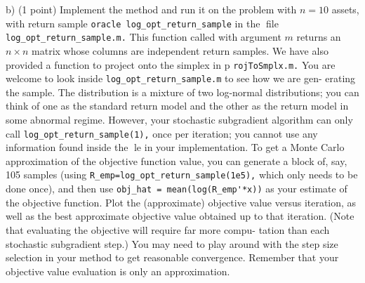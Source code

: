 \documentclass{article}
\begin{document}
b) (1 point) Implement the method and run it on the problem with $n = 10$ assets,
with return sample \verb|oracle log_opt_return_sample| in the file \verb|log_opt_return_sample.m.|
This function called with argument $m$ returns an $n \times n$ matrix whose columns
are independent return samples. We have also provided a function to project onto the simplex in p
\verb|rojToSmplx.m.|
You are welcome to look inside \verb|log_opt_return_sample.m| to see how we are gen-
erating the sample. The distribution is a mixture of two log-normal distributions;
you can think of one as the standard return model and the other as the return
model in some abnormal regime. However, your stochastic subgradient algorithm
can only call \verb|log_opt_return_sample(1),| once per iteration; you cannot use any
information found inside the le in your implementation.
To get a Monte Carlo approximation of the objective function value, you can generate a block of, say, 105 samples (using 
\verb|R_emp=log_opt_return_sample(1e5),|
which only needs to be done once), and then use 
\verb|obj_hat = mean(log(R_emp'*x))|
as your estimate of the objective function. Plot the (approximate) objective value
versus iteration, as well as the best approximate objective value obtained up to
that iteration. (Note that evaluating the objective will require far more compu-
tation than each stochastic subgradient step.)
You may need to play around with the step size selection in your method to get
reasonable convergence. Remember that your objective value evaluation is only
an approximation.	
\end{document}
